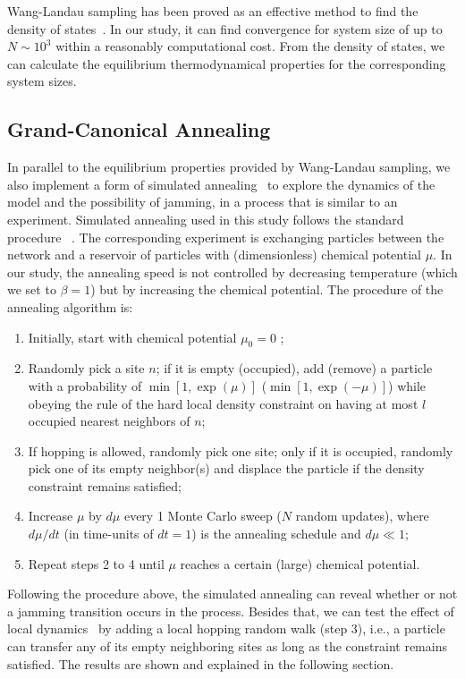 Wang-Landau sampling has been proved as an effective method to find
the density of states~\cite{Wang2001,Lee2006,Dickman2011}. In our
study, it can find convergence for system size of up to $N\sim10^{3}$
within a reasonably computational cost. From the density of states,
we can calculate the equilibrium thermodynamical properties for the
corresponding system sizes. 


\subsection{Grand-Canonical Annealing}

\label{sub:GCannealing} In parallel to the equilibrium properties
provided by Wang-Landau sampling, we also implement a form of simulated
annealing~\cite{SA} to explore the dynamics of the model and the
possibility of jamming, in a process that is similar to an experiment.
Simulated annealing used in this study follows the standard procedure
~\cite{Vcerny1985}. The corresponding experiment is exchanging particles
between the network and a reservoir of particles with (dimensionless)
chemical potential $\mu$. In our study, the annealing speed is not
controlled by decreasing temperature (which we set to $\beta=1$)
but by increasing the chemical potential. The procedure of the annealing algorithm
is: 
\begin{enumerate}
\item Initially, start with chemical potential $\mu_{0}=0$ ; 
\item Randomly pick a site $n$; if it is empty (occupied), add (remove)
a particle with a probability of $\min\left[1,\exp(\mu)\right]$ ($\min\left[1,\exp(-\mu)\right]$)
while obeying the rule of the hard local density constraint on having
at most $l$ occupied nearest neighbors of $n$; 
\item If hopping is allowed, randomly pick one site; only if it is occupied,
randomly pick one of its empty neighbor(s) and displace the particle
if the density constraint remains satisfied; 
\item Increase $\mu$ by $d\mu$ every 1 Monte Carlo sweep ($N$ random
updates), where $d\mu/dt$ (in time-units of $dt=1$) is the annealing
schedule and $d\mu\ll1$; 
\item Repeat steps 2 to 4 until $\mu$ reaches a certain (large) chemical
potential. 
\end{enumerate}
Following the procedure above, the simulated annealing can reveal
whether or not a jamming transition occurs in the process. Besides
that, we can test the effect of local dynamics~\cite{Biroli02, Krzakala2008}
by adding a local hopping random walk (step 3), i.e., a particle can
transfer any of its empty neighboring sites as long as 
the constraint remains satisfied.  The results are shown and explained in
the following section.


